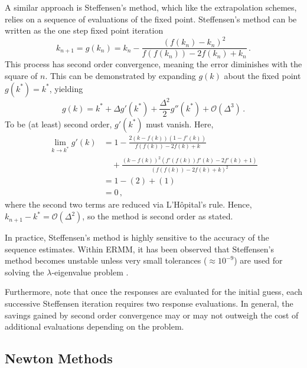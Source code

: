 A similar approach is Steffensen's method, which
like the extrapolation schemes, relies on a sequence of evaluations 
of the fixed point.
Steffensen's method can be written as the one step fixed point iteration
\begin{equation}
 k_{n+1} = g(k_n) = k_{n} - \frac{(f(k_n) - k_n)^2} 
                     {f(f(k_n)) - 2 f(k_n) + k_n}  \, .
\end{equation}
This process has second order convergence, meaning the error 
diminishes with the square of $n$.  This can be 
demonstrated by expanding $g(k)$ about the fixed point $g(k^*)=k^*$, yielding
\begin{equation}
 g(k) = k^* + \Delta g'(k^*) + \frac{\Delta^2}{2} g''(k^*) 
               + \mathcal{O}(\Delta^3) \, .
\end{equation}
To be (at least) second order, $g'(k^*)$ must vanish.  Here,
\begin{equation}
\begin{split}
  \lim_{k\to k^*}
    g'(k) &= 1 - \frac{2(k-f(k))(1-f'(k))}
                      {f(f(k))-2f(k)+k}\\
          & \quad + \frac{(k-f(k))^2(f'(f(k))f'(k) - 2f'(k)+1)}
                      {(f(f(k))-2f(k)+k)^2} \\
          &= 1 - (2) + (1) \\
          &= 0 \, ,
\end{split}
\end{equation}
where the second two terms are reduced via L'H\^{o}pital's rule.  Hence,
$k_{n+1} - k^* = \mathcal{O}(\Delta^2)$, so the method is second 
order as stated.

In practice, Steffensen's method is highly sensitive to the 
accuracy of the sequence estimates.  Within ERMM, it
has been observed that Steffensen's method becomes unstable
unless very small tolerances ($\approx 10^{-9}$) are used 
for solving the $\lambda$-eigenvalue problem \cite{roberts2012ksi}.

Furthermore, note that once the responses are evaluated for the initial
guess, each successive Steffensen iteration requires two response 
evaluations.  In general, the savings gained by second order convergence 
may or may not outweigh the cost of additional evaluations depending 
on the problem.


\subsection{Newton Methods}

